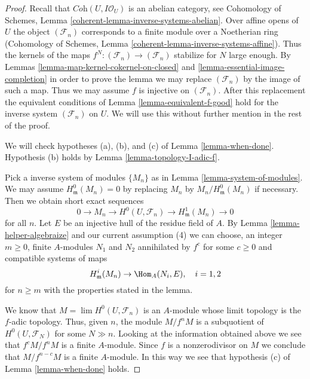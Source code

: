 \begin{proof}
Recall that $\textit{Coh}(U, I\mathcal{O}_U)$ is an abelian category, see
Cohomology of Schemes, Lemma \ref{coherent-lemma-inverse-systems-abelian}.
Over affine opens of $U$ the object $(\mathcal{F}_n)$
corresponds to a finite module over a Noetherian ring
(Cohomology of Schemes, Lemma \ref{coherent-lemma-inverse-systems-affine}).
Thus the kernels of the maps $f^N : (\mathcal{F}_n) \to (\mathcal{F}_n)$
stabilize for $N$ large enough. By
Lemmas \ref{lemma-map-kernel-cokernel-on-closed} and
\ref{lemma-essential-image-completion}
in order to prove the lemma
we may replace $(\mathcal{F}_n)$ by the image of such a map.
Thus we may assume $f$ is injective on $(\mathcal{F}_n)$.
After this replacement the equivalent conditions of
Lemma \ref{lemma-equivalent-f-good} hold for the inverse system
$(\mathcal{F}_n)$ on $U$. We will use this without further mention
in the rest of the proof.

\medskip\noindent
We will check hypotheses (a), (b), and (c) of
Lemma \ref{lemma-when-done}.
Hypothesis (b) holds by Lemma \ref{lemma-topology-I-adic-f}.

\medskip\noindent
Pick a inverse system of modules $\{M_n\}$ as in
Lemma \ref{lemma-system-of-modules}.
We may assume $H^0_\mathfrak m(M_n) = 0$ by replacing $M_n$ by
$M_n/H^0_\mathfrak m(M_n)$ if necessary. Then we obtain short exact
sequences
$$
0 \to M_n \to H^0(U, \mathcal{F}_n) \to H^1_\mathfrak m(M_n) \to 0
$$
for all $n$. Let $E$ be an injective hull of the residue field of $A$.
By Lemma \ref{lemma-helper-algebraize} and our current assumption (4)
we can choose, an integer $m \geq 0$, finite $A$-modules
$N_1$ and $N_2$ annihilated by $f^c$ for some $c \geq 0$ and
compatible systems of maps
$$
H^i_\mathfrak m(M_n) \to \Hom_A(N_i, E), \quad i = 1, 2
$$
for $n \geq m$
with the properties stated in the lemma.

\medskip\noindent
We know that $M = \lim H^0(U, \mathcal{F}_n)$ is an $A$-module whose
limit topology is the $f$-adic topology. Thus, given $n$, the module
$M/f^nM$ is a subquotient of $H^0(U, \mathcal{F}_N)$ for some $N \gg n$.
Looking at the information obtained above we see that
$f^cM/f^nM$ is a finite $A$-module. Since $f$ is a nonzerodivisor
on $M$ we conclude that $M/f^{n - c}M$ is a finite $A$-module.
In this way we see that hypothesis (c) of Lemma \ref{lemma-when-done} holds.


\end{proof}
